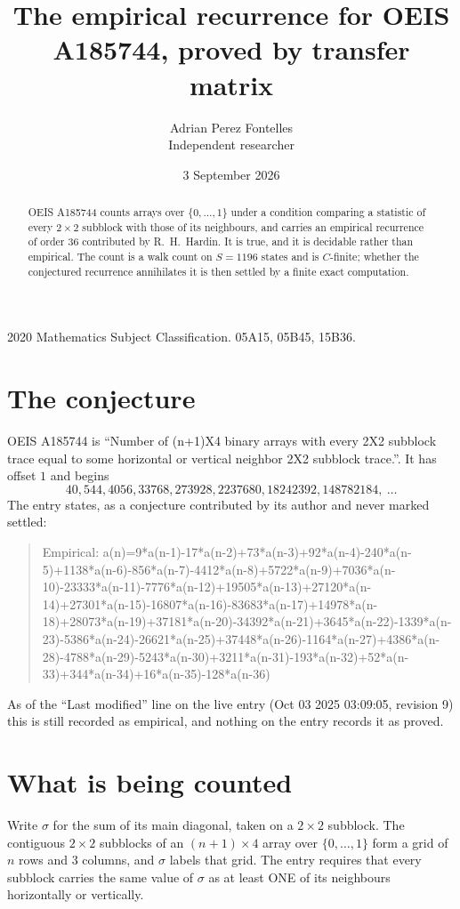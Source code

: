 \documentclass[11pt,a4paper]{article}
\title{The empirical recurrence for OEIS A185744, proved by transfer matrix}
\author{Adrian Perez Fontelles\\ \small Independent researcher}
\date{3 September 2026}
\theoremstyle{plain}
\theoremstyle{definition}
\begin{document}
\maketitle

\begin{abstract}
OEIS A185744 counts arrays over $\{0,\dots,1\}$ under a condition comparing a statistic of
every $2\times2$ subblock with those of its neighbours, and carries an empirical recurrence
of order $36$ contributed by R.~H.~Hardin. It is true, and it is decidable rather than
empirical. The count is a walk count on $S=1196$ states and is $C$-finite; whether the
conjectured recurrence annihilates it is then settled by a finite exact computation.
\end{abstract}

\noindent\small 2020 Mathematics Subject Classification. 05A15, 05B45, 15B36.\normalsize

\section{The conjecture}

OEIS A185744 is ``Number of (n+1)X4 binary arrays with every 2X2 subblock trace equal to some horizontal or vertical neighbor 2X2 subblock trace.''. It has offset $1$ and begins
\[
40, 544, 4056, 33768, 273928, 2237680, 18242392, 148782184,\ \dots
\]
The entry states, as a conjecture contributed by its author and never marked settled:
\begin{quote}
Empirical: a(n)=9*a(n-1)-17*a(n-2)+73*a(n-3)+92*a(n-4)-240*a(n-5)+1138*a(n-6)-856*a(n-7)-4412*a(n-8)+5722*a(n-9)+7036*a(n-10)-23333*a(n-11)-7776*a(n-12)+19505*a(n-13)+27120*a(n-14)+27301*a(n-15)-16807*a(n-16)-83683*a(n-17)+14978*a(n-18)+28073*a(n-19)+37181*a(n-20)-34392*a(n-21)+3645*a(n-22)-1339*a(n-23)-5386*a(n-24)-26621*a(n-25)+37448*a(n-26)-1164*a(n-27)+4386*a(n-28)-4788*a(n-29)-5243*a(n-30)+3211*a(n-31)-193*a(n-32)+52*a(n-33)+344*a(n-34)+16*a(n-35)-128*a(n-36)
\end{quote}
As of the ``Last modified'' line on the live entry (Oct 03 2025 03:09:05, revision 9) this is still
recorded as empirical, and nothing on the entry records it as proved.

\section{What is being counted}

Write $\sigma$ for the sum of its main diagonal, taken on a $2\times2$ subblock. The contiguous $2\times2$
subblocks of an $(n+1)\times4$ array over $\{0,\dots,1\}$ form a grid of $n$ rows
and $3$ columns, and $\sigma$ labels that grid. The entry
requires that every subblock carries the same value of $\sigma$ as at least ONE of its neighbours horizontally or vertically.
\end{document}
